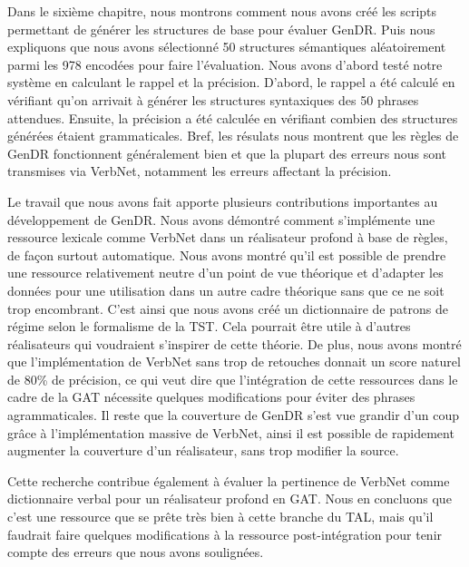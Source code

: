 Dans le sixième chapitre, nous montrons comment nous avons créé les scripts permettant de générer les structures de base pour évaluer GenDR. Puis nous expliquons que nous avons sélectionné 50 structures sémantiques aléatoirement parmi les 978 encodées pour faire l'évaluation. Nous avons d'abord testé notre système en calculant le rappel et la précision. D'abord, le rappel a été calculé en vérifiant qu'on arrivait à générer les structures syntaxiques des 50 phrases attendues. Ensuite, la précision a été calculée en vérifiant combien des structures générées étaient grammaticales. Bref, les résulats nous montrent que les règles de GenDR fonctionnent généralement bien et que la plupart des erreurs nous sont transmises via VerbNet, notamment les erreurs affectant la précision.

Le travail que nous avons fait apporte plusieurs contributions importantes au développement de GenDR. Nous avons démontré comment s'implémente une ressource lexicale comme VerbNet dans un réalisateur profond à base de règles, de façon surtout automatique. Nous avons montré qu'il est possible de prendre une ressource relativement neutre d'un point de vue théorique et d'adapter les données pour une utilisation dans un autre cadre théorique sans que ce ne soit trop encombrant. C'est ainsi que nous avons créé un dictionnaire de patrons de régime selon le formalisme de la \ac{TST}. Cela pourrait être utile à d'autres réalisateurs qui voudraient s'inspirer de cette théorie. De plus, nous avons montré que l'implémentation de VerbNet sans trop de retouches donnait un score naturel de 80\% de précision, ce qui veut dire que l'intégration de cette ressources dans le cadre de la \ac{GAT} nécessite quelques modifications pour éviter des phrases agrammaticales. Il reste que la couverture de GenDR s'est vue grandir d'un coup grâce à l'implémentation massive de VerbNet, ainsi il est possible de rapidement augmenter la couverture d'un réalisateur, sans trop modifier la source. 

Cette recherche contribue également à évaluer la pertinence de VerbNet comme dictionnaire verbal pour un réalisateur profond en \ac{GAT}. Nous en concluons que c'est une ressource que se prête très bien à cette branche du \ac{TAL}, mais qu'il faudrait faire quelques modifications à la ressource post-intégration pour tenir compte des erreurs que nous avons soulignées.

